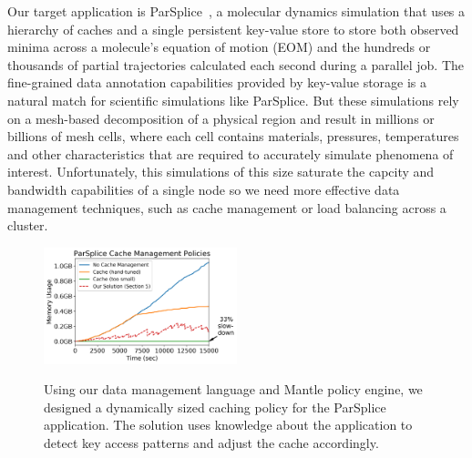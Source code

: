 Our target application is ParSplice~\cite{perez:jctc20150parsplice}, a
molecular dynamics simulation that uses a hierarchy of caches and a single
persistent key-value store to store both observed minima across a molecule's
equation of motion (EOM) and the hundreds or thousands of partial trajectories
calculated each second during a parallel job.  The fine-grained data annotation
capabilities provided by key-value storage is a natural match for scientific
simulations like ParSplice. But these simulations rely on a mesh-based
decomposition of a physical region and result in millions or billions of mesh
cells, where each cell contains materials, pressures, temperatures and other
characteristics that are required to accurately simulate phenomena of interest.
Unfortunately, this simulations of this size saturate the capcity and bandwidth
capabilities of a single node so we need more effective data management
techniques, such as cache management or load balancing across a cluster.

\begin{figure}[t]
\noindent\includegraphics[width=0.5\textwidth]{figures/cache-management.png}\\

\caption{Using our data management language and Mantle policy engine, we
designed a dynamically sized caching policy for the ParSplice application. The
solution uses knowledge about the application to detect key access patterns and
adjust the cache accordingly. 
\label{fig:cache-management}}
\end{figure}

